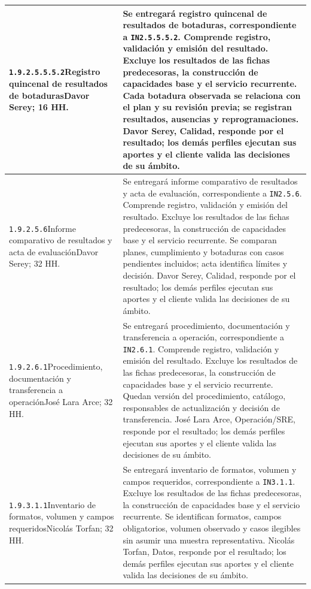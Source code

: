 \begin{longtable}{L{52mm}L{91mm}}
\texttt{1.\allowbreak{}9.\allowbreak{}2.\allowbreak{}5.\allowbreak{}5.\allowbreak{}5.\allowbreak{}2}\newline Registro quincenal de resultados de botaduras\newline Davor Serey; 16 HH. & Se entregará registro quincenal de resultados de botaduras, correspondiente a \texttt{IN2.5.5.5.2}. Comprende registro, validación y emisión del resultado. Excluye los resultados de las fichas predecesoras, la construcción de capacidades base y el servicio recurrente.  Cada botadura observada se relaciona con el plan y su revisión previa; se registran resultados, ausencias y reprogramaciones. Davor Serey, Calidad, responde por el resultado; los demás perfiles ejecutan sus aportes y el cliente valida las decisiones de su ámbito.\\\hline
\texttt{1.\allowbreak{}9.\allowbreak{}2.\allowbreak{}5.\allowbreak{}6}\newline Informe comparativo de resultados y acta de evaluación\newline Davor Serey; 32 HH. & Se entregará informe comparativo de resultados y acta de evaluación, correspondiente a \texttt{IN2.5.6}. Comprende registro, validación y emisión del resultado. Excluye los resultados de las fichas predecesoras, la construcción de capacidades base y el servicio recurrente.  Se comparan planes, cumplimiento y botaduras con casos pendientes incluidos; acta identifica límites y decisión. Davor Serey, Calidad, responde por el resultado; los demás perfiles ejecutan sus aportes y el cliente valida las decisiones de su ámbito.\\\hline
\texttt{1.\allowbreak{}9.\allowbreak{}2.\allowbreak{}6.\allowbreak{}1}\newline Procedimiento, documentación y transferencia a operación\newline José Lara Arce; 32 HH. & Se entregará procedimiento, documentación y transferencia a operación, correspondiente a \texttt{IN2.6.1}. Comprende registro, validación y emisión del resultado. Excluye los resultados de las fichas predecesoras, la construcción de capacidades base y el servicio recurrente.  Quedan versión del procedimiento, catálogo, responsables de actualización y decisión de transferencia. José Lara Arce, Operación/SRE, responde por el resultado; los demás perfiles ejecutan sus aportes y el cliente valida las decisiones de su ámbito.\\\hline
\texttt{1.\allowbreak{}9.\allowbreak{}3.\allowbreak{}1.\allowbreak{}1}\newline Inventario de formatos, volumen y campos requeridos\newline Nicolás Torfan; 32 HH. & Se entregará inventario de formatos, volumen y campos requeridos, correspondiente a \texttt{IN3.1.1}. Excluye los resultados de las fichas predecesoras, la construcción de capacidades base y el servicio recurrente.  Se identifican formatos, campos obligatorios, volumen observado y casos ilegibles sin asumir una muestra representativa. Nicolás Torfan, Datos, responde por el resultado; los demás perfiles ejecutan sus aportes y el cliente valida las decisiones de su ámbito.\\\hline

\end{longtable}
